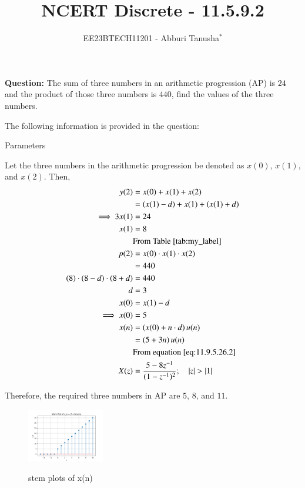 \documentclass[journal,12pt,twocolumn]{IEEEtran}
\theoremstyle{remark}
\begin{document}

\vspace{3cm}

\title{NCERT Discrete - 11.5.9.2}
\author{EE23BTECH11201 - Abburi Tanusha$^{*}$%
}
\maketitle
\newpage
\bigskip

\renewcommand{\thefigure}{\theenumi}
\renewcommand{\thetable}{\theenumi}

\vspace{3cm}

\maketitle
\textbf{Question:} 
The sum of three numbers in an arithmetic progression (AP) is $24$ and the product of those three numbers is $440$, find the values of the three numbers.

\solution
The following information is provided in the question:
\begin{table}[h]
 	\centering
 	\resizebox{6 cm}{!}{
 		
 	}
 	\vspace{6 pt}
 	\caption{Parameters}
 	\label{tab:my_label} 
 \end{table}
\newline
Let the three numbers in the arithmetic progression be denoted as $x(0)$, $x(1)$, and $x(2)$. Then,
\begin{align}
  y(2) &= x(0) + x(1) + x(2) \\ 
    &= \left(x(1) - d \right) + x(1) + \left(x(1) + d\right) \\
    \implies 3x(1) &= 24 \\ 
    x(1) &= 8 \\
    &\text{From Table \ref{tab:my_label}}  \\
   p(2) &= x(0) \cdot x(1) \cdot x(2)   \\
   &= 440  \\
    \left(8\right) \cdot \left(8-d\right) \cdot \left(8+d\right) &= 440  \\
   d &= 3  \\
     x(0) &= x(1) - d \\
     \implies x(0) &= 5  \\
    x(n) &= \left(x(0) + n \cdot d\right) u(n)  \\
         &= \left(5 + 3n\right)u(n)  \\
         &\text{From equation \eqref{eq:11.9.5.26.2}}  \\
    X(z) &= \frac{5 - 8z^{-1}}{(1-z^{-1})^2} ; \quad \left\vert z\right\vert>\left\vert1\right\vert 
\end{align}

Therefore, the required three numbers in AP are $5$, $8$, and $11$.

\begin{figure}[h!]
  \centering
  \includegraphics[width=0.3\textwidth]{figs/stem_plot.png} 
  \label{fig:1}
  \caption{stem plots of x(n)}
\end{figure}
\end{document}
